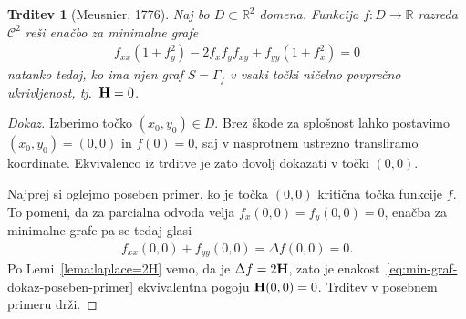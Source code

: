 \documentclass[12pt,a4paper,twoside]{article}
\theoremstyle{definition} %
\newenvironment{dokaz}[1][Dokaz]{\begin{proof}[#1]}{\end{proof}}
\theoremstyle{plain} %
\newtheorem{trditev}[definicija]{Trditev}
\numberwithin{equation}{section}  %
\newcommand{\R}{\mathbb R}
\begin{document}
\begin{trditev} [Meusnier, 1776] \label{trd:min-graf-H=0}
Naj bo $D \subset \R^2$ domena. Funkcija $f \colon D \to \R$ razreda $\mathcal{C}^2$ reši enačbo za minimalne grafe
\begin{gather*}
f_{xx}(1+f_{y}^2) - 2f_{x}f_{y}f_{xy} + f_{yy}(1+f_{x}^2) = 0
\end{gather*}
natanko tedaj, ko ima njen graf $S = \Gamma_{f}$ v vsaki točki ničelno povprečno ukrivljenost, tj.~$\textup{\textbf{H}} = 0$.
\end{trditev}

\begin{dokaz}
Izberimo točko $(x_0,y_0) \in D$. Brez škode za splošnost lahko postavimo $(x_0,y_0)=(0,0)$ in $f(0)=0$, saj v nasprotnem ustrezno transliramo koordinate. Ekvivalenco iz trditve je zato dovolj dokazati v točki $(0,0)$.

Najprej si oglejmo poseben primer, ko je točka $(0,0)$ kritična točka funkcije $f$. To pomeni, da za parcialna odvoda velja $f_{x}(0,0)=f_{y}(0,0)=0$, enačba za minimalne grafe pa se tedaj glasi
\begin{gather} \label{eq:min-graf-dokaz-poseben-primer}
f_{xx}(0,0) + f_{yy}(0,0) = \Delta f(0,0) = 0.
\end{gather}
Po Lemi~\ref{lema:laplace=2H} vemo, da je $\Delta f = 2\textup{\textbf{H}}$, zato je enakost~\eqref{eq:min-graf-dokaz-poseben-primer} ekvivalentna pogoju $\textup{\textbf{H}}(0,0) = 0$. Trditev v posebnem primeru drži.


\end{dokaz}
\end{document}
